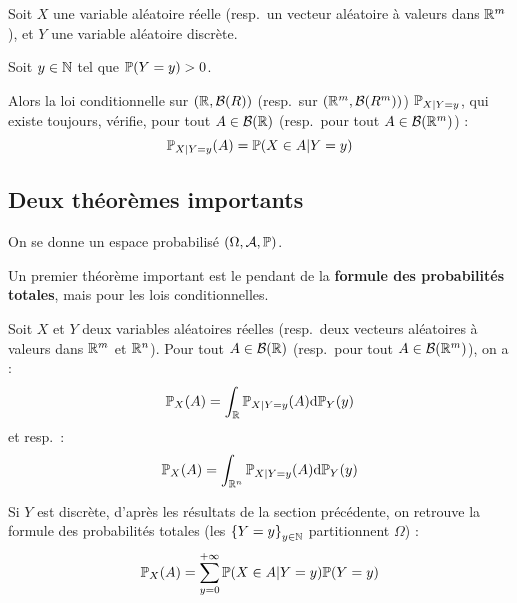 \documentclass[../integ-proba.tex]{subfiles}
\begin{document}
    \begin{thm}
        Soit $X$ une variable aléatoire réelle (resp.\ un vecteur aléatoire à valeurs dans $\mathbb{R}^m$), et $Y$ une variable aléatoire discrète.

        Soit $y \in \mathbb{N}$ tel que $\mathbb{P}(Y = y) > 0$.

        Alors la loi conditionnelle sur $\left( \mathbb{R}, \mathcal{B}(R) \right)$ (resp.\ sur $\left( \mathbb{R}^m, \mathcal{B}(R^m) \right)$) $\mathbb{P}_{X | Y = y}$, qui existe toujours, vérifie, pour tout $A \in \mathcal{B}(\mathbb{R})$ (resp.\ pour tout $A \in \mathcal{B}(\mathbb{R}^m)$) :
        \begin{displaymath}
            \mathbb{P}_{X | Y = y}(A) = \mathbb{P}(X \in A | Y = y)
        \end{displaymath}
    \end{thm}

    \subsection{Deux théorèmes importants}

    On se donne un espace probabilisé $\left( \Omega, \mathcal{A}, \mathbb{P} \right)$.

    Un premier théorème important est le pendant de la \textbf{formule des probabilités totales}, mais pour les lois conditionnelles.

    \begin{thm}
        Soit $X$ et $Y$ deux variables aléatoires réelles (resp.\ deux vecteurs aléatoires à valeurs dans $\mathbb{R}^m$ et $\mathbb{R}^n$).
        Pour tout $A \in \mathcal{B}(\mathbb{R})$ (resp.\ pour tout $A \in \mathcal{B}(\mathbb{R}^m)$), on a :
        \begin{displaymath}
            \mathbb{P}_X(A) = \int_{\mathbb{R}} \mathbb{P}_{X | Y = y} (A) \textnormal{d} \mathbb{P}_Y(y)
        \end{displaymath}
        et resp.\ :
        \begin{displaymath}
            \mathbb{P}_X(A) = \int_{\mathbb{R}^n} \mathbb{P}_{X | Y = y} (A) \textnormal{d} \mathbb{P}_Y(y)
        \end{displaymath}
    \end{thm}

    \begin{rem}
        Si $Y$ est discrète, d'après les résultats de la section précédente, on retrouve la formule des probabilités totales (les $\left\{ Y = y \right\}_{y \in \mathbb{N}}$ partitionnent $\Omega$) :
        \begin{displaymath}
            \mathbb{P}_X(A) = \sum_{y = 0}^{+ \infty} \mathbb{P}(X \in A | Y = y) \mathbb{P}(Y = y)
        \end{displaymath}
    \end{rem}
\end{document}
